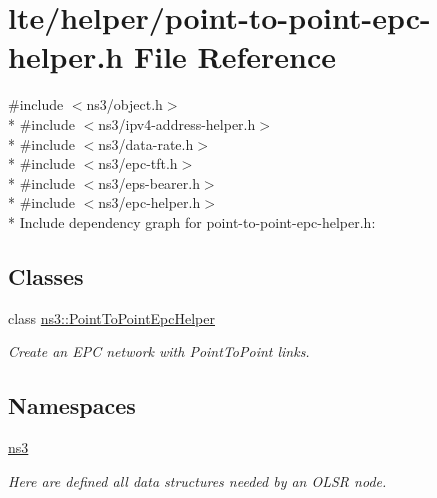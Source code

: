 \hypertarget{point-to-point-epc-helper_8h}{}\section{lte/helper/point-\/to-\/point-\/epc-\/helper.h File Reference}
\label{point-to-point-epc-helper_8h}
{\ttfamily \#include $<$ns3/object.\+h$>$}\\*
{\ttfamily \#include $<$ns3/ipv4-\/address-\/helper.\+h$>$}\\*
{\ttfamily \#include $<$ns3/data-\/rate.\+h$>$}\\*
{\ttfamily \#include $<$ns3/epc-\/tft.\+h$>$}\\*
{\ttfamily \#include $<$ns3/eps-\/bearer.\+h$>$}\\*
{\ttfamily \#include $<$ns3/epc-\/helper.\+h$>$}\\*
Include dependency graph for point-\/to-\/point-\/epc-\/helper.h\+:
\subsection*{Classes}
\begin{DoxyCompactItemize}
\item 
class \hyperlink{classns3_1_1PointToPointEpcHelper}{ns3\+::\+Point\+To\+Point\+Epc\+Helper}
\begin{DoxyCompactList}\small\item\em Create an E\+PC network with Point\+To\+Point links. \end{DoxyCompactList}\end{DoxyCompactItemize}
\subsection*{Namespaces}
\begin{DoxyCompactItemize}
\item 
 \hyperlink{namespacens3}{ns3}
\begin{DoxyCompactList}\small\item\em Here are defined all data structures needed by an O\+L\+SR node. \end{DoxyCompactList}\end{DoxyCompactItemize}
